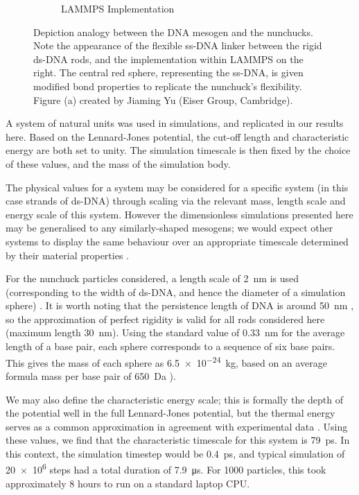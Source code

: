 \documentclass[11pt, a4paper]{article} %
\begin{document}
\begin{figure}[ht]
\begin{subfigure}{.4\textwidth}
		\caption{LAMMPS Implementation}
		\label{fig:nunchuck_implementation}
	\end{subfigure}
	\caption{Depiction analogy between the DNA mesogen and the nunchucks. Note the appearance of the flexible ss-DNA linker between the rigid ds-DNA rods, and the implementation within LAMMPS on the right. The central red sphere, representing the ss-DNA, is given modified bond properties to replicate the nunchuck's flexibility. Figure (a) created by Jiaming Yu (Eiser Group, Cambridge).}
	\label{fig:nunchucks_visual}
	\hfill
\end{figure}

A system of natural units was used in simulations, and replicated in our results here. Based on the Lennard-Jones potential, the cut-off length and characteristic energy are both set to unity. The simulation timescale is then fixed by the choice of these values, and the mass of the simulation body. 

The physical values for a system may be considered for a specific system (in this case strands of ds-DNA) through scaling via the relevant mass, length scale and energy scale of this system. However the dimensionless simulations presented here may be generalised to any similarly-shaped mesogens; we would expect other systems to display the same behaviour over an appropriate timescale determined by their material properties \cite{Rapaport2004}.

For the nunchuck particles considered, a length scale of \SI{2}{\nano\metre} is used (corresponding to the width of ds-DNA, and hence the diameter of a simulation sphere) \cite{Arnott1972}. It is worth noting that the persistence length of DNA is around \SI{50}{\nano\metre} \cite{Garcia2007}, so the approximation of perfect rigidity is valid for all rods considered here (maximum length \SI{30}{\nano\metre}). Using the standard value of \SI{0.33}{\nano\metre} \cite{Langridge1960} for the average length of a base pair, each sphere corresponds to a sequence of six base pairs. This gives the mass of each sphere as \SI{6.5e-24}{\kilogram}, based on an average formula mass per base pair of \SI{650}{\dalton} \cite{Duewer2018}). 

We may also define the characteristic energy scale; this is formally the depth of the potential well in the full Lennard-Jones potential, but the thermal energy serves as a common approximation \cite{Pan2010} in agreement with experimental data \cite{Wang2002}. Using these values, we find that the characteristic timescale for this system is \SI{79}{\pico\second}. In this context, the simulation timestep would be \SI{0.4}{\pico\second}, and typical simulation of \num{20e6} steps had a total duration of \SI{7.9}{\micro\second}. For \num{1000} particles, this took approximately $8$ hours to run on a standard laptop CPU. %
\end{document}
